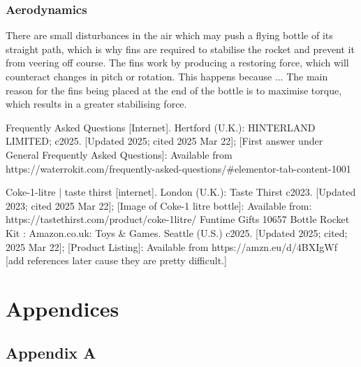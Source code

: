 \documentclass[14pt]{article}
\begin{document}
\subsubsection{Aerodynamics}
There are small disturbances in the air which may push a flying bottle of its straight path, which is why fins are required to stabilise the rocket and prevent it from veering off course. The fins work by producing a restoring force, which will counteract changes in pitch or rotation. This happens because ...
The main reason for the fins being placed at the end of the bottle is to maximise torque, which results in a greater stabilising force.
\begin{thebibliography}{0}
Frequently Asked Questions [Internet]. Hertford (U.K.): HINTERLAND LIMITED; c2025. [Updated 2025; cited 2025 Mar 22]; [First answer under General Frequently Asked Questions]: Available from https://waterrokit.com/frequently-asked-questions/\#elementor-tab-content-1001

Coke-1-litre | taste thirst [internet]. London (U.K.): Taste Thirst c2023. [Updated 2023; cited 2025 Mar 22]; [Image of Coke-1 litre bottle]: Available from: https://tastethirst.com/product/coke-1litre/
Funtime Gifts 10657 Bottle Rocket Kit : Amazon.co.uk: Toys \& Games. Seattle (U.S.) c2025. [Updated 2025; cited; 2025 Mar 22]; [Product Listing]: Available from https://amzn.eu/d/4BXIgWf
[add references later cause they are pretty difficult.]
\end{thebibliography}

\section{Appendices}
\subsection{Appendix A}
\label {Appendix A}
\end{document}
